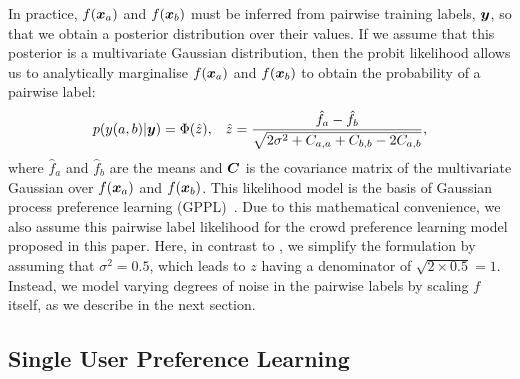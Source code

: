 In practice, $f(\boldsymbol x_a)$ and $f(\boldsymbol x_b)$ must be inferred from
pairwise training labels, $\boldsymbol y$,
so that we obtain a posterior distribution over their values.
If we assume that this posterior is a multivariate Gaussian distribution,
then the probit likelihood allows us to analytically marginalise 
$f(\boldsymbol x_a)$ and $f(\boldsymbol x_b)$
to obtain the probability of a pairwise label:
\begin{align}
p(y(a,b)| \boldsymbol y) 
= \Phi(\hat{z}),& & \hat{z} = \frac{\hat{f}_a - \hat{f}_b}{\sqrt{2\sigma^2 + C_{a,a} + C_{b,b} 
- 2C_{a,b}} }, \label{eq:predict_z}
\end{align}
where $\hat{f}_a$ and $\hat{f}_b$ are the means and
$\boldsymbol C$ is the covariance matrix of the multivariate Gaussian over
$f(\boldsymbol x_a)$ and $f(\boldsymbol x_b)$.
This likelihood model is the basis of Gaussian process preference learning (GPPL)~\citep{chu2005preference}. 
Due to this mathematical convenience,
we also assume this pairwise label likelihood for the crowd
preference learning model proposed in this paper.
Here, in contrast to \citet{chu2005preference},
we simplify the formulation by assuming that $\sigma^2 = 0.5$,
which leads to $z$ having a denominator of $\sqrt{2 \times 0.5}=1$.
Instead, we model varying degrees of noise in the pairwise labels
by scaling $f$ itself, as we describe in the next section.


\subsection{Single User Preference Learning}


